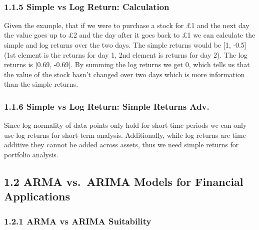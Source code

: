 \documentclass[11pt]{article}
\begin{document}
    \begin{center}
    \end{center}
    { \hspace*{\fill} \\}
    
    \hypertarget{simple-vs-log-return-calculation}{%
\subsubsection{1.1.5 Simple vs Log Return:
Calculation}\label{simple-vs-log-return-calculation}}

Given the example, that if we were to purchase a stock for £1 and the
next day the value goes up to £2 and the day after it goes back to £1 we
can calculate the simple and log returns over the two days. The simple
returns would be {[}1, -0.5{]} (1st element is the returns for day 1,
2nd element is returns for day 2). The log returns is {[}0.69, -0.69{]}.
By summing the log returns we get 0, which tells us that the value of
the stock hasn't changed over two days which is more information than
the simple returns.

\hypertarget{simple-vs-log-return-simple-returns-adv.}{%
\subsubsection{1.1.6 Simple vs Log Return: Simple Returns
Adv.}\label{simple-vs-log-return-simple-returns-adv.}}

Since log-normality of data points only hold for short time periods we
can only use log returns for short-term analysis. Additionally, while
log returns are time-additive they cannot be added across assets, thus
we need simple returns for portfolio analysis.

    \hypertarget{arma-vs.-arima-models-for-financial-applications}{%
\subsection{1.2 ARMA vs.~ARIMA Models for Financial
Applications}\label{arma-vs.-arima-models-for-financial-applications}}

\hypertarget{arma-vs-arima-suitability}{%
\subsubsection{1.2.1 ARMA vs ARIMA
Suitability}\label{arma-vs-arima-suitability}}
\end{document}
